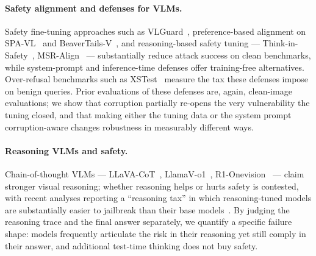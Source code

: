 \paragraph{Safety alignment and defenses for VLMs.}
Safety fine-tuning approaches such as VLGuard~\cite{zong2024vlguard}, preference-based alignment on SPA-VL~\cite{zhang2024spavl} and BeaverTails-V~\cite{saferlhfv2025}, and reasoning-based safety tuning --- Think-in-Safety~\cite{tis2025}, MSR-Align~\cite{msralign2025} --- substantially reduce attack success on clean benchmarks, while system-prompt and inference-time defenses offer training-free alternatives. Over-refusal benchmarks such as XSTest~\cite{rottger2024xstest} measure the tax these defenses impose on benign queries. Prior evaluations of these defenses are, again, clean-image evaluations; we show that corruption partially re-opens the very vulnerability the tuning closed, and that making either the tuning data or the system prompt corruption-aware changes robustness in measurably different ways.

\paragraph{Reasoning VLMs and safety.}
Chain-of-thought VLMs --- LLaVA-CoT~\cite{xu2024llavacot}, LlamaV-o1~\cite{thawakar2025llamavo1}, R1-Onevision~\cite{yang2025r1onevision} --- claim stronger visual reasoning; whether reasoning helps or hurts safety is contested, with recent analyses reporting a ``reasoning tax'' in which reasoning-tuned models are substantially easier to jailbreak than their base models~\cite{safemlrm2025,tis2025}. By judging the reasoning trace and the final answer separately, we quantify a specific failure shape: models frequently articulate the risk in their reasoning yet still comply in their answer, and additional test-time thinking does not buy safety.
